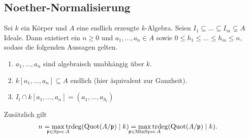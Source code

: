 \documentclass[12pt,a4paper]{scrartcl}
\theoremstyle{cplain}
\theoremstyle{cdef}
\begin{document}
\subsection{Noether-Normalisierung}
\begin{satz} \label{thm:noether-normalisierung}
	Sei $k$ ein Körper und $A$ eine endlich erzeugte $k$-Algebra. Seien $I_1\subseteq \dots \subseteq I_m\subsetneq A$ Ideale. Dann existiert ein $n\ge 0$ und $a_1,\dots, a_n\in A$ sowie $0\le h_1\le\dots \le h_m\le n$, sodass die folgenden Aussagen gelten. 
	\begin{enumerate}
		\item $a_1,\dots, a_n$ sind algebraisch unabhängig über $k$.
		\item $k[a_1,\dots, a_n]\subseteq A$ endlich (hier äquivalent zur Ganzheit).
		\item $I_l\cap k[a_1,\dots, a_n] = (a_1,\dots, a_{h_l})$
	\end{enumerate}
	Zusätzlich gilt
	\[n = \max_{\mathclap{\fp\in\Spec A}} \trdeg(\Quot(A/\fp)\mid k) = \max_{\mathclap{\fp \in \MinSpec A}}\trdeg(\Quot(A/\fp)\mid k).\]
\end{satz}

\end{document}
